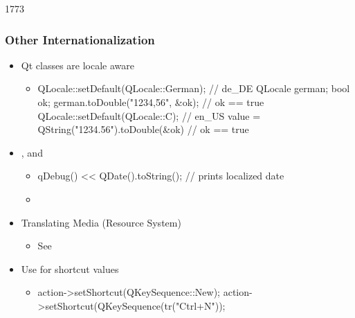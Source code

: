 \begin{slide}[fragile]{1773}\frametitle{Other Internationalization}
  \begin{itemize}
  \item Qt classes are locale aware
    \begin{itemize}
    \item[] \begin{cpp}
QLocale::setDefault(QLocale::German); // de_DE
QLocale german; bool ok;
german.toDouble("1234,56", &ok); // ok == true
QLocale::setDefault(QLocale::C); // en_US
value = QString("1234.56").toDouble(&ok) // ok == true
     \end{cpp}
   \end{itemize}
  \item {},  and 
    \begin{itemize}
    \item[] \begin{cpp}
qDebug() << QDate().toString();  // prints localized date
      \end{cpp}
   \item {}

    \end{itemize}
 \item Translating Media (Resource System)
   \begin{itemize}
   \item See 
   \end{itemize}
  \item Use  for shortcut values
    \begin{itemize}
    \item []\begin{cpp}
action->setShortcut(QKeySequence::New);
action->setShortcut(QKeySequence(tr("Ctrl+N"));
      \end{cpp}
    \end{itemize}
  \end{itemize}
\end{slide}


%
